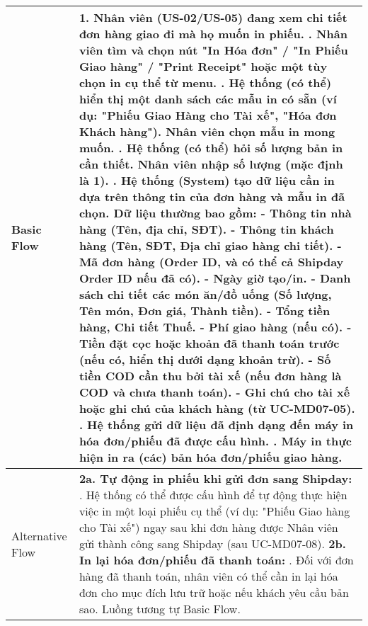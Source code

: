 \begin{longtable}{|m{4cm}|p{11cm}|}
\hline
Basic Flow & 1. Nhân viên (US-02/US-05) đang xem chi tiết đơn hàng giao đi mà họ muốn in phiếu. \newline 2. Nhân viên tìm và chọn nút "In Hóa đơn" / "In Phiếu Giao hàng" / "Print Receipt" hoặc một tùy chọn in cụ thể từ menu. \newline 3. Hệ thống (có thể) hiển thị một danh sách các mẫu in có sẵn (ví dụ: "Phiếu Giao Hàng cho Tài xế", "Hóa đơn Khách hàng"). Nhân viên chọn mẫu in mong muốn. \newline 4. Hệ thống (có thể) hỏi số lượng bản in cần thiết. Nhân viên nhập số lượng (mặc định là 1). \newline 5. Hệ thống (System) tạo dữ liệu cần in dựa trên thông tin của đơn hàng và mẫu in đã chọn. Dữ liệu thường bao gồm: \newline    - Thông tin nhà hàng (Tên, địa chỉ, SĐT). \newline    - Thông tin khách hàng (Tên, SĐT, Địa chỉ giao hàng chi tiết). \newline    - Mã đơn hàng (Order ID, và có thể cả Shipday Order ID nếu đã có). \newline    - Ngày giờ tạo/in. \newline    - Danh sách chi tiết các món ăn/đồ uống (Số lượng, Tên món, Đơn giá, Thành tiền). \newline    - Tổng tiền hàng, Chi tiết Thuế. \newline    - Phí giao hàng (nếu có). \newline    - Tiền đặt cọc hoặc khoản đã thanh toán trước (nếu có, hiển thị dưới dạng khoản trừ). \newline    - Số tiền COD cần thu bởi tài xế (nếu đơn hàng là COD và chưa thanh toán). \newline    - Ghi chú cho tài xế hoặc ghi chú của khách hàng (từ UC-MD07-05). \newline 6. Hệ thống gửi dữ liệu đã định dạng đến máy in hóa đơn/phiếu đã được cấu hình. \newline 7. Máy in thực hiện in ra (các) bản hóa đơn/phiếu giao hàng. \\
\hline
Alternative Flow & \textbf{2a. Tự động in phiếu khi gửi đơn sang Shipday:} \newline    1. Hệ thống có thể được cấu hình để tự động thực hiện việc in một loại phiếu cụ thể (ví dụ: "Phiếu Giao hàng cho Tài xế") ngay sau khi đơn hàng được Nhân viên gửi thành công sang Shipday (sau UC-MD07-08). \newline \textbf{2b. In lại hóa đơn/phiếu đã thanh toán:} \newline    1. Đối với đơn hàng đã thanh toán, nhân viên có thể cần in lại hóa đơn cho mục đích lưu trữ hoặc nếu khách yêu cầu bản sao. Luồng tương tự Basic Flow. \\

\end{longtable}
